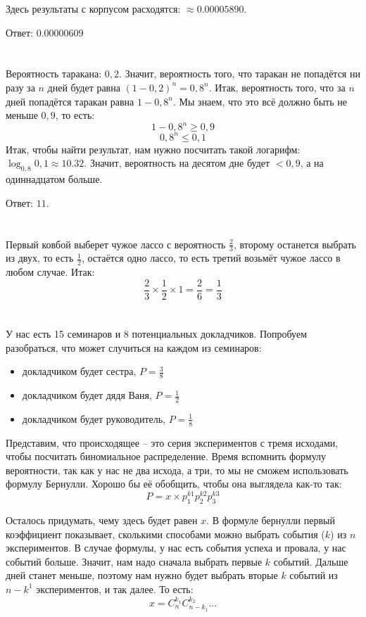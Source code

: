 \documentclass[a4paper,10pt]{article}
\begin{document}
Здесь результаты с корпусом расходятся: $\approx 0.00005890$.

Ответ: $0.00000609$

\section{}
Вероятность таракана: $0,2$. Значит, вероятность того, что таракан не попадётся ни разу за $n$ дней будет равна $(1 - 0,2)^n = 0,8^n$. Итак, вероятность того, что за $n$ дней попадётся таракан равна $1 - 0,8^n$. Мы знаем, что это всё должно быть не меньше $0,9$, то есть:
$$ 1 - 0,8^n \geqslant 0,9$$
$$ 0,8^n \leqslant 0,1 $$
Итак, чтобы найти результат, нам нужно посчитать такой логарифм:
$ \log_{0,8} 0,1 \approx 10.32 $. Значит, вероятность на десятом дне будет $<0,9$,
а на одиннадцатом больше.

Ответ: $11$.

\section{}
Первый ковбой выберет чужое лассо с вероятность $\frac{2}{3}$, второму останется выбрать из двух, то есть $\frac{1}{2}$, остаётся одно лассо, то есть третий возьмёт чужое лассо в любом случае. Итак:
$$ \frac{2}{3} \times \frac{1}{2} \times 1 = \frac{2}{6} = \frac{1}{3} $$

\section{}
У нас есть 15 семинаров и 8 потенциальных докладчиков. Попробуем разобраться, что может случиться на каждом из семинаров:
\begin{itemize}
 \item докладчиком будет сестра, $P = \frac{3}{8}$
 \item докладчиком будет дядя Ваня, $P = \frac{1}{2}$
 \item докладчиком будет руководитель, $P = \frac{1}{8}$
\end{itemize}

Представим, что происходящее -- это серия экспериментов с тремя исходами, чтобы посчитать биномиальное распределение. Время вспомнить формулу вероятности, так как у нас не два исхода, а три, то мы не сможем использовать формулу Бернулли. Хорошо бы её обобщить, чтобы она выглядела как-то так:
$$ P = x \times p_1^{k1} p_2^{k2} p_3^{k3} $$

Осталось придумать, чему здесь будет равен $x$. В формуле бернулли первый коэффициент показывает,
сколькими способами можно выбрать события ($k$) из $n$ экспериментов.
В случае формулы, у нас есть события успеха и провала, у нас событий больше.
Значит, нам надо сначала выбрать первые $k$ событий. Дальше дней станет меньше,
поэтому нам нужно будет выбрать вторые $k$ событий из $n-k^1$ экспериментов, и так далее.
То есть:
$$x = C_n^{k_{1}} C_{n-k_1}^{k_{2}} ... $$
\end{document}
